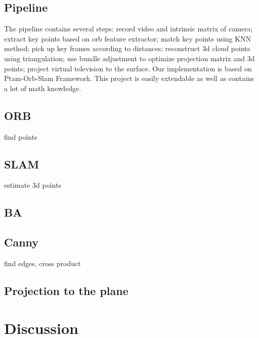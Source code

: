 \documentclass[paper=a4, fontsize=14pt]{scrartcl}
\numberwithin{equation}{section}        %
\numberwithin{figure}{section}          %
\numberwithin{table}{section}               %
\begin{document}
\subsection{Pipeline}
The pipeline contains several steps: record video and intrinsic matrix of camera; extract key points based on orb feature extractor; match key points using KNN method; pick up key frames according to distances; reconstruct 3d cloud points using triangulation; use bundle adjustment to optimize projection matrix and 3d points; project virtual television to the surface. Our implementation is based on Ptam-Orb-Slam Framework. This project is easily extendable as well as contains a lot of math knowledge.

\subsection{ORB} find points

\subsection{SLAM} estimate 3d points

\subsection{BA}

\subsection{Canny} find edges, cross product

\subsection{Projection to the plane}

\section{Discussion}\label{discussion}





\end{document}
